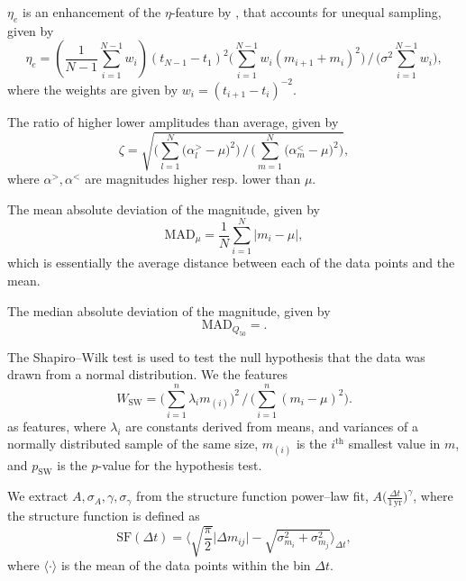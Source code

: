 \begin{enumerate}
 $\eta_e$ is an enhancement of the $\eta$-feature by \citet{kim2014}, that accounts for unequal sampling, given by
\begin{equation}\eta_e = (\frac{1}{N-1}\sum_{i=1}^{N-1} w_i) (t_{N-1} - t_1)^2 \big( \sum\limits_{i=1}^{N-1} w_i (m_{i+1} + m_i)^2 \big) \, / \, \big( \sigma^2 \sum\limits_{i=1}^{N-1} w_i \big),\end{equation}
where the weights are given by $w_i = (t_{i+1} - t_i)^{-2}$.

 The ratio of higher \resp lower amplitudes than average, given by
\begin{equation}\zeta = \sqrt{ \Big(\sum\limits_{l=1}^N \big( \alpha^{>}_l - \mu \big)^2\Big) \, / \, \Big(\sum\limits_{m=1}^N \big( \alpha^{<}_m - \mu \big)^2\Big)},\end{equation}
where $\alpha^{>}, \alpha^{<}$ are magnitudes higher resp. lower than $\mu$.

 The mean absolute deviation of the magnitude, given by
\begin{equation}\text{MAD}_{\mu} = \frac{1}{N} \sum\limits_{i=1}^{N} | m_i - \mu |,\end{equation}
which is essentially the average distance between each of the data points and the mean.

 The median absolute deviation of the magnitude, given by
\begin{equation}\text{MAD}_{Q_{50}} = .\end{equation}

 The Shapiro--Wilk test \citep{shapiro1965} is used to test the null hypothesis that the data was drawn from a normal distribution. We the features
\begin{equation}W_{\text{SW}} = \big(\sum\limits_{i=1}^n \lambda_i m_{(i)}\big)^2 \, / \, \big(\sum\limits_{i=1}^n (m_i - \mu)^2\big).\end{equation}
as features, where $\lambda_i$ are constants derived from means, and variances of a normally distributed sample of the same size, $m_{(i)}$ is the $i^\text{th}$ smallest value in $m$, and $p_{\text{SW}}$ is the $p$-value for the hypothesis test.

 We extract $A, \sigma_A, \gamma, \sigma_\gamma$ from the structure function power--law fit, $A \big(\frac{\Delta t}{1 \, \mathrm{yr}}\big)^\gamma$, where the structure function is defined as
\begin{equation}\text{SF}(\Delta t) = \big\langle \sqrt{\frac{\pi}{2}} \big| \Delta m_{ij}  \big| - \sqrt{\sigma_{m_i}^2 + \sigma_{m_j}^2} \big\rangle_{\Delta t},\end{equation}
where $\langle \cdot \rangle$ is the mean of the data points within the bin $\Delta t$.


\end{enumerate}
